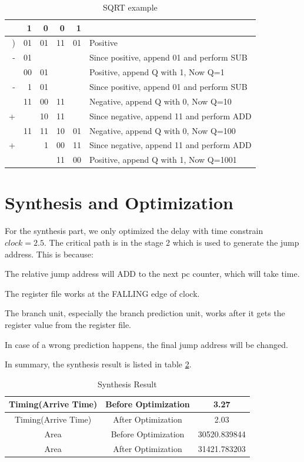 \begin{table}[!ht]
\centering
\caption{SQRT example}
\label{tab:sqrt}
\begin{tabular}{rrrrr l}
  &  1 &  0 &  0 &  1 & \\
\hline
) & 01 & 01 & 11 & 01 & Positive\\
- & 01 &    &    &    & Since positive, append 01 and perform SUB\\
\hline
  & 00 & 01 &    &    & Positive, append Q with 1, Now Q=1\\
- &  1 & 01 &    &    & Since positive, append 01 and perform SUB\\
\hline
  & 11 & 00 & 11 &    & Negative, append Q with 0, Now Q=10\\
+ &    & 10 & 11 &    & Since negative, append 11 and perform ADD\\
\hline
  & 11 & 11 & 10 & 01 & Negative, append Q with 0, Now Q=100\\
+ &    &  1 & 00 & 11 & Since negative, append 11 and perform ADD\\
\hline
  &    &    & 11 & 00 & Positive, append Q with 1, Now Q=1001\\
\end{tabular}
\end{table}


\section[Synthesis and Optimization]{Synthesis and Optimization}
For the synthesis part, we only optimized the delay with time constrain $clock=2.5$.
The critical path is in the stage 2 which is used to generate the jump address. This
is because:

\begin{description}
  \item The relative jump address will ADD to the next pc counter, which will take time.
  \item The register file works at the FALLING edge of clock.
  \item The branch unit, especially the branch prediction unit, works after it gets the register value from the register file.
  \item In case of a wrong prediction happens, the final jump address will be changed.
\end{description}

In summary, the synthesis result is listed in table \ref{tab:syn}.
\begin{table}[!ht]
\centering
\caption{Synthesis Result}
\label{tab:syn}
\begin{tabular}{|c|c|c|}
\hline
Timing(Arrive Time) & Before Optimization & 3.27 \\
\hline
Timing(Arrive Time) & After Optimization & 2.03 \\
\hline
Area & Before Optimization & 30520.839844 \\
\hline
Area & After Optimization & 31421.783203 \\
\hline
\end{tabular}
\end{table}

